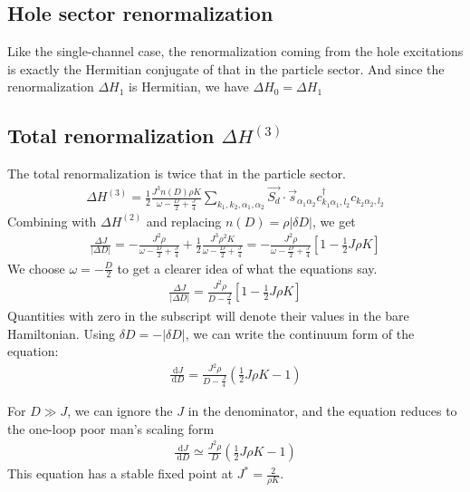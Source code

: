 \documentclass[12pt]{revtex4-2}
\begin{document}
\subsection{Hole sector renormalization}
Like the single-channel case, the renormalization coming from the hole excitations is exactly the Hermitian conjugate of that in the particle sector. And since the renormalization \(\Delta H_1\) is Hermitian, we have \(\Delta H_0 = \Delta H_1\)

\subsection{Total renormalization \(\Delta H^{(3)}\)}
The total renormalization is twice that in the particle sector.
\begin{align}
	\Delta H^{(3)} = \frac{1}{2}\frac{J^3 n(D) \rho K}{\omega - \frac{D}{2} + \frac{J}{4}} \sum_{k_1,k_2,\alpha_1,\alpha_2} \vec{S_d}\cdot\vec{s}_{\alpha_1 \alpha_2} c^\dagger_{k_1\alpha_1,l_2}c_{k_2 \alpha_2,l_2}
\end{align}
Combining with \(\Delta H^{(2)}\) and replacing \(n(D) = \rho |\delta D|\), we get
\begin{align}
	\frac{\Delta J}{|\Delta D|} = -\frac{J^2 \rho}{\omega - \frac{D}{2} + \frac{J}{4}} + \frac{1}{2}\frac{J^3 \rho^2 K}{\omega - \frac{D}{2} + \frac{J}{4}} = -\frac{J^2 \rho}{\omega - \frac{D}{2} + \frac{J}{4}}\left[1 - \frac{1}{2}J\rho K\right] 
\end{align}
We choose \(\omega = -\frac{D}{2}\) to get a clearer idea of what the equations say. 
\begin{align}
	\label{mchannel}
	\frac{\Delta J}{|\Delta D|} = \frac{J^2 \rho}{D - \frac{J}{4}}\left[1 - \frac{1}{2}J\rho K\right] 
\end{align}
Quantities with zero in the subscript will denote their values in the bare Hamiltonian. Using \(\delta D = -|\delta D|\), we can write the continuum form of the equation:
\begin{align}
	\label{rg_beta}
	\frac{\:\mathrm{d}J}{\:\mathrm{d}D} = \frac{J^2 \rho}{D - \frac{J}{4}}\left(\frac{1}{2}J\rho K - 1\right)
\end{align}

For \(D \gg J\), we can ignore the \(J\) in the denominator, and the equation reduces to the one-loop poor man's scaling form \cite{Kogan_2018,Kuramoto1998}
\begin{align}
	\label{pms_mchannel}
	\frac{\:\mathrm{d}J}{\:\mathrm{d}D} \simeq  \frac{J^2 \rho}{D}\left(\frac{1}{2}J\rho K - 1\right)
\end{align}
This equation has a stable fixed point at \(J^* = \frac{2}{\rho K}\).
\end{document}
